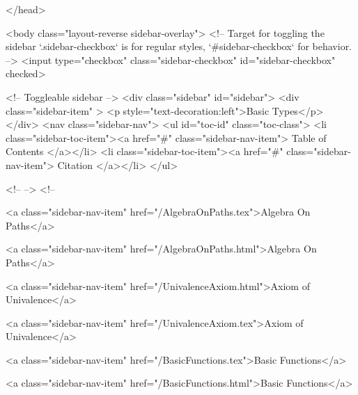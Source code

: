   
</head>




  <body class="layout-reverse sidebar-overlay">
    <!-- Target for toggling the sidebar `.sidebar-checkbox` is for regular
     styles, `#sidebar-checkbox` for behavior. -->
<input type="checkbox" class="sidebar-checkbox" id="sidebar-checkbox" checked>

<!-- Toggleable sidebar -->
<div class="sidebar" id="sidebar">
  <div class="sidebar-item" >
    <p style="text-decoration:left">Basic Types</p>
  </div>
  <nav class="sidebar-nav">
    <ul id="toc-id" class="toc-class">
  <li class="sidebar-toc-item"><a href="#" class="sidebar-nav-item"> Table of Contents </a></li>
  <li class="sidebar-toc-item"><a href="#" class="sidebar-nav-item"> Citation </a></li>
</ul>


    <!--  -->
    <!-- 
      
    
      
    
      
    
      
        
      
    
      
        
          <a class="sidebar-nav-item" href="/AlgebraOnPaths.tex">Algebra On Paths</a>
        
      
    
      
        
          <a class="sidebar-nav-item" href="/AlgebraOnPaths.html">Algebra On Paths</a>
        
      
    
      
        
          <a class="sidebar-nav-item" href="/UnivalenceAxiom.html">Axiom of Univalence</a>
        
      
    
      
        
          <a class="sidebar-nav-item" href="/UnivalenceAxiom.tex">Axiom of Univalence</a>
        
      
    
      
        
          <a class="sidebar-nav-item" href="/BasicFunctions.tex">Basic Functions</a>
        
      
    
      
        
          <a class="sidebar-nav-item" href="/BasicFunctions.html">Basic Functions</a>
        
      
    
      
        
